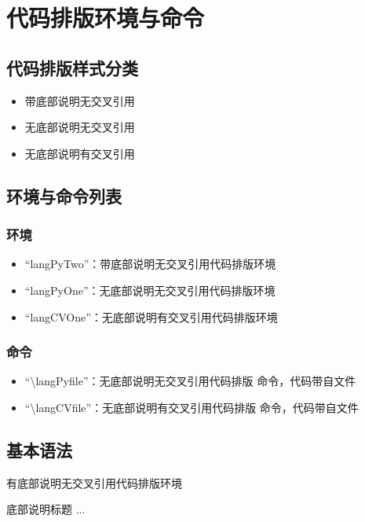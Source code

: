 \documentclass{ctexart}
\newcommand{\qtmark}[1]{``#1''}
\begin{document}
\section{代码排版环境与命令}
\subsection{代码排版样式分类 }
\begin{itemize}
\item 带底部说明无交叉引用
\item 无底部说明无交叉引用
\item 无底部说明有交叉引用
\end{itemize}
\subsection{环境与命令列表}
\subsubsection{环境}
\begin{itemize}
\item \qtmark{langPyTwo}：带底部说明无交叉引用代码排版环境
\item \qtmark{langPyOne}：无底部说明无交叉引用代码排版环境
\item \qtmark{langCVOne}：无底部说明有交叉引用代码排版环境
\end{itemize}
\subsubsection{命令}
\begin{itemize}
\item \qtmark{\textbackslash langPyfile}：无底部说明无交叉引用代码排版
  命令，代码带自文件
\item \qtmark{\textbackslash langCVfile}：无底部说明有交叉引用代码排版
  命令，代码带自文件
\end{itemize}

\subsection{基本语法}
\begin{langPyOne}[tex]{有底部说明无交叉引用代码排版环境}
  \begin{langPyTwo}[语言]{底部说明}{标题}
     ...
   \end{langPyTwo} 
\end{langPyOne}

\end{document}
